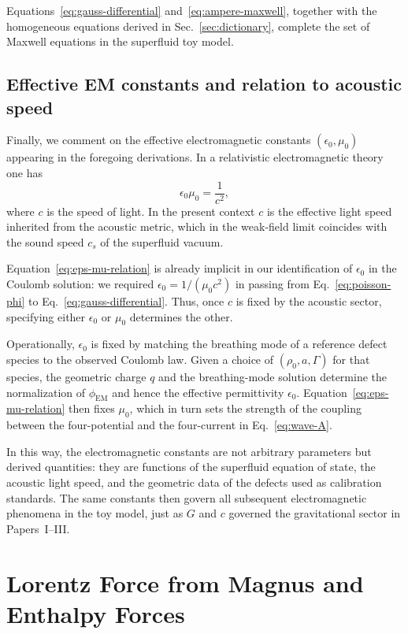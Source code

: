 \documentclass[11pt]{article}
\begin{document}
Equations~\eqref{eq:gauss-differential} and~\eqref{eq:ampere-maxwell}, together with the homogeneous equations derived in Sec.~\ref{sec:dictionary}, complete the set of Maxwell equations in the superfluid toy model.

\subsection{Effective EM constants and relation to acoustic speed}

Finally, we comment on the effective electromagnetic constants $(\epsilon_0,\mu_0)$ appearing in the foregoing derivations.  In a relativistic electromagnetic theory one has
\begin{equation}
\epsilon_0 \mu_0 = \frac{1}{c^2},
\label{eq:eps-mu-relation}
\end{equation}
where $c$ is the speed of light.  In the present context $c$ is the effective light speed inherited from the acoustic metric, which in the weak-field limit coincides with the sound speed $c_s$ of the superfluid vacuum.

Equation~\eqref{eq:eps-mu-relation} is already implicit in our identification of $\epsilon_0$ in the Coulomb solution: we required $\epsilon_0 = 1/(\mu_0 c^2)$ in passing from Eq.~\eqref{eq:poisson-phi} to Eq.~\eqref{eq:gauss-differential}.  Thus, once $c$ is fixed by the acoustic sector, specifying either $\epsilon_0$ or $\mu_0$ determines the other.

Operationally, $\epsilon_0$ is fixed by matching the breathing mode of a reference defect species to the observed Coulomb law.  Given a choice of $(\rho_0,a,\Gamma)$ for that species, the geometric charge $q$ and the breathing-mode solution determine the normalization of $\phi_{\mathrm{EM}}$ and hence the effective permittivity $\epsilon_0$.  Equation~\eqref{eq:eps-mu-relation} then fixes $\mu_0$, which in turn sets the strength of the coupling between the four-potential and the four-current in Eq.~\eqref{eq:wave-A}.

In this way, the electromagnetic constants are not arbitrary parameters but derived quantities: they are functions of the superfluid equation of state, the acoustic light speed, and the geometric data of the defects used as calibration standards.  The same constants then govern all subsequent electromagnetic phenomena in the toy model, just as $G$ and $c$ governed the gravitational sector in Papers~I--III.

\section{Lorentz Force from Magnus and Enthalpy Forces}
\label{sec:lorentz-magnus}
\end{document}
